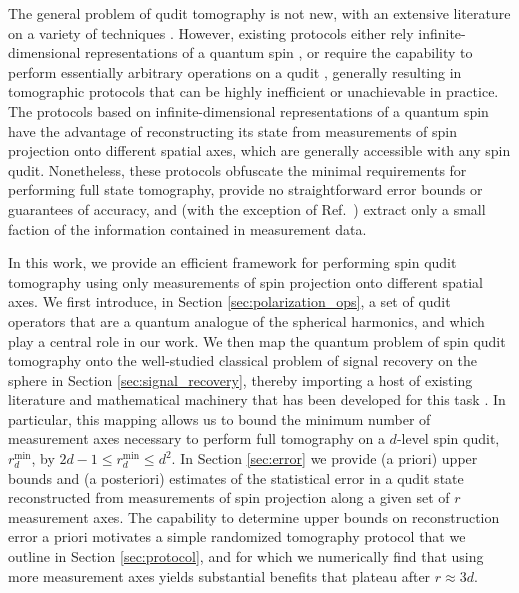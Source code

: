 \documentclass[notitlepage,twocolumn]{revtex4-2}
\renewcommand{\t}{\text} %
\begin{document}
The general problem of qudit tomography is not new, with an extensive literature on a variety of techniques \cite{manko1997spin, schmied2011tomographic, evrard2019enhanced, flammia2005minimal, thew2002qudit, salazar2012quantum, sosa-martinez2017quantum, ha2018minimal, stefano2019set, palici2020oam}.
However, existing protocols either rely infinite-dimensional representations of a quantum spin \cite{manko1997spin, schmied2011tomographic, evrard2019enhanced}, or require the capability to perform essentially arbitrary operations on a qudit \cite{thew2002qudit, flammia2005minimal, salazar2012quantum, sosa-martinez2017quantum, ha2018minimal, stefano2019set, palici2020oam}, generally resulting in tomographic protocols that can be highly inefficient or unachievable in practice.
The protocols based on infinite-dimensional representations of a quantum spin have the advantage of reconstructing its state from measurements of spin projection onto different spatial axes, which are generally accessible with any spin qudit.
Nonetheless, these protocols obfuscate the minimal requirements for performing full state tomography, provide no straightforward error bounds or guarantees of accuracy, and (with the exception of Ref.~\cite{schmied2011tomographic}) extract only a small faction of the information contained in measurement data.

In this work, we provide an efficient framework for performing spin qudit tomography using only measurements of spin projection onto different spatial axes.
We first introduce, in Section \ref{sec:polarization_ops}, a set of qudit operators that are a quantum analogue of the spherical harmonics, and which play a central role in our work.
We then map the quantum problem of spin qudit tomography onto the well-studied classical problem of signal recovery on the sphere in Section \ref{sec:signal_recovery}, thereby importing a host of existing literature and mathematical machinery that has been developed for this task \cite{mcewen2011novel, rauhut2011sparse, alem2012sparse, khalid2014optimaldimensionality}.
In particular, this mapping allows us to bound the minimum number of measurement axes necessary to perform full tomography on a $d$-level spin qudit, $r_d^{\t{min}}$, by $2d-1\le r_d^{\t{min}}\le d^2$.
In Section \ref{sec:error} we provide (a priori) upper bounds and (a posteriori) estimates of the statistical error in a qudit state reconstructed from measurements of spin projection along a given set of $r$ measurement axes.
The capability to determine upper bounds on reconstruction error a priori motivates a simple randomized tomography protocol that we outline in Section \ref{sec:protocol}, and for which we numerically find that using more measurement axes yields substantial benefits that plateau after $r\approx3d$.
\end{document}
